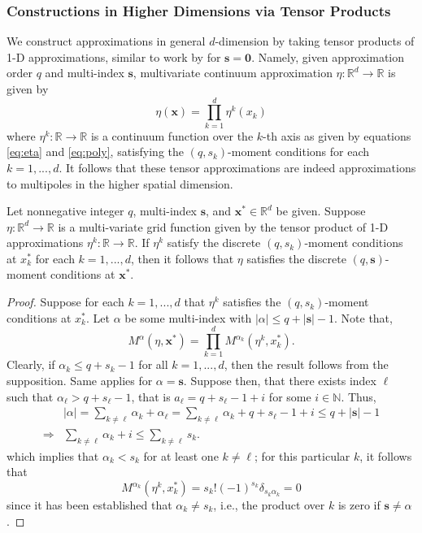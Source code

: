 \subsubsection{Constructions in Higher Dimensions via Tensor Products}

We construct approximations in general $d$-dimension by taking tensor products of 1-D approximations, similar to work by \cite{TorEng:04} for $\mathbf s=\mathbf 0$.
Namely, given approximation order $q$ and multi-index $\mathbf s$, multivariate continuum approximation $\eta:\mathbb R^d\to \mathbb R$ is given by
\begin{equation}\label{eq:tensor_eta}
	\eta(\mathbf x) = \prod_{k=1}^{d} \eta^k(x_k) 
\end{equation}
where $\eta^k:\mathbb R\to \mathbb R$ is a continuum function over the $k$-th axis as given by equations \ref{eq:eta} and \ref{eq:poly}, satisfying the $(q,s_k)$-moment conditions for each $k=1,...,d$.
It follows that these tensor approximations are indeed approximations to multipoles in the higher spatial dimension.

\begin{theorem}\label{thm:prodmomcond}
	Let nonnegative integer $q$, multi-index $\mathbf s$, and $\mathbf x^*\in\mathbb R^d$ be given. 
Suppose $\eta:\mathbb R^d\to\mathbb R$ is a multi-variate grid function given by the tensor product of 1-D approximations $\eta^{k}:\mathbb R\to\mathbb R$.
If $\eta^{k}$ satisfy the discrete $(q,s_k)$-moment conditions at $x^*_k$ for each $k=1,...,d$, then it follows that $\eta$ satisfies the discrete $(q,\mathbf s)$-moment conditions at $\mathbf x^*$.
\end{theorem}

\begin{proof}
Suppose for each $k=1,...,d$ that $\eta^{k}$ satisfies the $(q,s_k)$-moment conditions at $x^*_k$. 
Let $\alpha$ be some multi-index with $|\alpha|\le q+|\mathbf s|-1$. 
Note that,
\[
	M^\alpha(\eta,\mathbf x^*) = \prod_{k=1}^d M^{\alpha_k}(\eta^{k},x^*_k).
\]
Clearly, if $\alpha_k\le q+s_k-1$ for all $k=1,...,d$, then the result follows from the supposition. 
Same applies for $\alpha=\mathbf s$.
Suppose then, that there exists index $\ell$ such that $\alpha_\ell>q+s_\ell-1$, that is $a_\ell=q+s_\ell -1 +i$ for some $i\in\mathbb N$. Thus,
\begin{align*}
	& |\alpha| = \sum_{k\neq \ell} \alpha_k + \alpha_\ell = \sum_{k\neq \ell} \alpha_k + q+s_\ell-1+i \le q + |\mathbf s| -1\\
\Longrightarrow	&  \sum_{k\neq\ell} \alpha_k + i \le \sum_{k\neq \ell} s_k.
\end{align*}
which implies that $\alpha_k<s_k$ for at least one $k\neq\ell$;
for this particular $k$, it follows that 
\[
	M^{\alpha_k}(\eta^{k},x^*_k) = s_k!(-1)^{s_k} \delta_{s_k \alpha_k} = 0
\]
since it has been established that $\alpha_k\neq s_k$, i.e., the product over $k$ is zero if $\mathbf s\neq \alpha$.
\end{proof}


